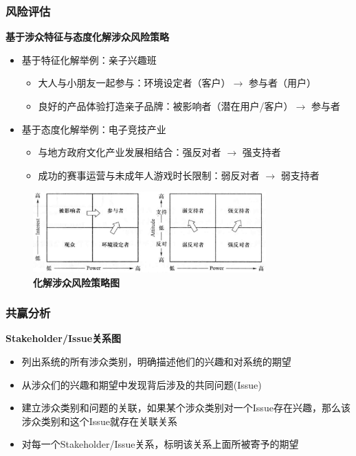 \subsubsection{风险评估}
\textbf{基于涉众特征与态度化解涉众风险策略}
\begin{itemize}
    \item 基于特征化解举例：亲子兴趣班
    \begin{itemize}
        \item 大人与小朋友一起参与：环境设定者（客户）$\rightarrow$ 参与者（用户）
        \item 良好的产品体验打造亲子品牌：被影响者（潜在用户/客户）$\rightarrow$ 参与者
    \end{itemize}
    \item 基于态度化解举例：电子竞技产业
    \begin{itemize}
        \item 与地方政府文化产业发展相结合：强反对者 $\rightarrow$ 强支持者
        \item 成功的赛事运营与未成年人游戏时长限制：弱反对者 $\rightarrow$ 弱支持者
    \end{itemize}
\end{itemize}

\begin{figure}[H]
	\centering
	\includegraphics[width=0.8\textwidth]{img/化解涉众风险策略图.png}
    \caption*{\textbf{化解涉众风险策略图}}
    \vspace{-1em}
\end{figure}

\subsubsection{共赢分析}
\textbf{Stakeholder/Issue关系图}
\begin{itemize}
    \item 列出系统的所有涉众类别，明确描述他们的兴趣和对系统的期望
    \item 从涉众们的兴趣和期望中发现背后涉及的共同问题(Issue)
    \item 建立涉众类别和问题的关联，如果某个涉众类别对一个Issue存在兴趣，那么该涉众类别和这个Issue就存在关联关系
    \item 对每一个Stakeholder/Issue关系，标明该关系上面所被寄予的期望
\end{itemize}

